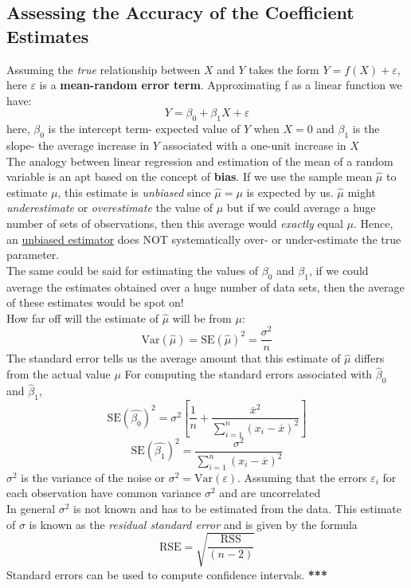 \documentclass{article}
\begin{document}
\subsection*{Assessing the Accuracy of the Coefficient Estimates}
Assuming the \textit{true} relationship between $X$ and $Y$ takes the form $Y = f(X) + \varepsilon$, here $\varepsilon$ is a \textbf{mean-random error term}. Approximating f as a linear function we have:\
\begin{equation*} Y = \beta_0 + \beta_1 X + \varepsilon \end{equation*}
here, $\beta_0$ is the intercept term- expected value of $Y$ when $X = 0$ and $\beta_1$ is the slope- the average increase in $Y$ associated with a one-unit increase in $X$ 
\\[6mm]
The analogy between linear regression and estimation of the mean of a random variable is an apt based on the concept of \textbf{bias}. If we use the sample mean $\hat{\mu}$ to estimate $\mu$, this estimate is \textit{unbiased} since $\hat{\mu} = \mu$ is expected by us. $\hat{\mu}$ might \textit{underestimate} or \textit{overestimate} the value of $\mu$ but if we could average a huge number of sets of observations, then this average would \textit{exactly} equal $\mu$. Hence, an \underline{unbiased estimator} does NOT systematically over- or under-estimate the true parameter. 
\\ The same could be said for estimating the values of $\beta_0$ and $\beta_1$, if we could average the estimates obtained over a huge number of data sets, then the average of these estimates would be spot on! 
\\[6mm]
How far off will the estimate of $\hat{\mu}$ will be from $\mu$: \\
\begin{equation*}\text{Var}{(\hat{\mu})} = \text{SE}{(\hat{\mu})}^{2} = \frac{\sigma^{2}}{n} \tag{Standard error}\end{equation*}
The standard error tells us the average amount that this estimate of $\hat{\mu}$ differs from the actual value $\mu$ 
For computing the standard errors associated with $\hat{\beta}_0$ and $\hat{\beta}_1$, 
\begin{equation*} \text{SE}{(\hat{\beta_0})}^2 = \sigma^{2} \left[\frac{1}{n} + \frac{\overline{x}^2}{{\sum_{i=1}^{n}{(x_i - \overline{x})}^2}}\right] \end{equation*}
\begin{equation*} \text{SE}{(\hat{\beta_1})}^2 = \frac{\sigma^{2}}{{\sum_{i=1}^{n}{(x_i - \overline{x})}^2}}\end{equation*}
$\sigma^{2}$ is the variance of the noise or $\sigma^{2} = \text{Var}(\varepsilon)$. Assuming that the errors $\varepsilon_i$ for each observation have common variance $\sigma^{2}$ and are uncorrelated
\\ In general $\sigma^{2}$ is not known and has to be estimated from the data. This estimate of $\sigma$ is known as the \textit{residual standard error} and is given by the formula \begin{equation*} \text{RSE} = \sqrt{\frac{\text{RSS}}{(n-2)}} \end{equation*}
Standard errors can be used to compute confidence intervals. 
\vfill
\centering \textbf{***}
\end{document}
